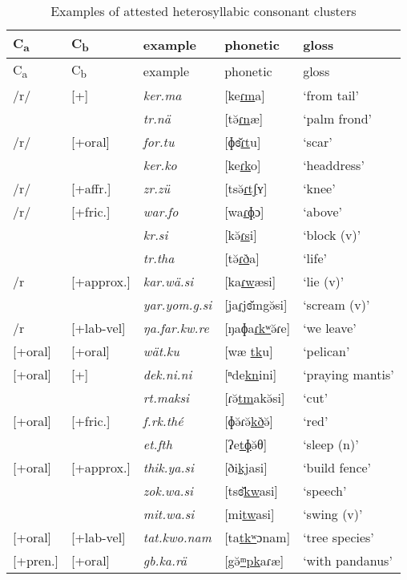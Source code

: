 \begin{longtable}{p{2cm}p{2cm}lll}
\caption{Examples of attested heterosyllabic consonant clusters}
\label{heterosyllcctableexamples}
	\\
	\lsptoprule
	C\textsubscript{a} & C\textsubscript{b} & {example} & {phonetic} & {gloss}\\\midrule
	\endfirsthead
	C\textsubscript{a} & C\textsubscript{b} & {example} & {phonetic} & {gloss}\\\midrule
	\endhead
	/r/ & [+\isi{nasal}] &\emph{ker.ma}&[ke\uline{ɾm}a] &`from tail'\\
	&&\emph{tr.nä} &[tə̆\uline{ɾn}æ] &`palm frond'\\
	/r/ &[+oral] &\emph{for.tu}&[ɸɞ̆\uline{ɾt}u] &`scar'\\
	&&\emph{ker.ko}&[ke\uline{ɾk}o] &`headdress'\\
	/r/ &[+affr.]&\emph{zr.zü}&[tsə̆\uline{ɾtʃ}ʏ] &`knee' \\
	/r/ &[+fric.] &\emph{war.fo}&[wa\uline{ɾɸ}ɔ] &`above'\\
	&&\emph{kr.si}&[kə̆\uline{ɾs}i] &`block (v)'\\
	&&\emph{tr.tha}&[tə̆\uline{ɾð}a] &`life'\\
	/r&[+approx.]&\emph{kar.wä.si}&[ka\uline{ɾw}æsi] &`lie (v)'\\
	&&\emph{yar.yom.g.si}&[ja\uline{ɾj}ɞ̆m{\ᵑ}gə̆si] &`scream (v)'\\
	/r&[+lab-vel]&\emph{ŋa.far.kw.re}&[ŋaɸa\uline{ɾkʷ}ə̆ɾe]&`we leave'\\
	{[+oral]}&[+oral]&\emph{wät.ku}&[wæ \uline{tk}u]&`pelican'\\
	{[+oral]} &[+\isi{nasal}]&\emph{dek.ni.ni}&[ⁿde\uline{kn}ini]&`praying mantis'\\
	&&\emph{rt.maksi}&[ɾə̆\uline{tm}akə̆si]&`cut'\\
	{[+oral]} &[+fric.]&\emph{f.rk.thé}&[ɸə̆ɾə̆\uline{kð}ə̆]&`red'\\
	&&\emph{et.fth}&[ʔe\uline{tɸ}ə̆θ]&`sleep (n)'\\
	{[+oral]} &[+approx.]&\emph{thik.ya.si}&[ði\uline{kj}asi]&`build fence'\\
	&&\emph{zok.wa.si}&[tsɞ̆\uline{kw}asi]&`speech'\\
	&&\emph{mit.wa.si}&[mi\uline{tw}asi]&`swing (v)'\\
	{[+oral]} &[+lab-vel]&\emph{tat.kwo.nam}&[ta\uline{tkʷ}ɔnam]&`tree species'\\
	{[+pren.]}&[+oral]&\emph{gb.ka.rä}&[{\ᵑ}gə̆\uline{ᵐpk}aɾæ]&`with pandanus'\\

\end{longtable}
